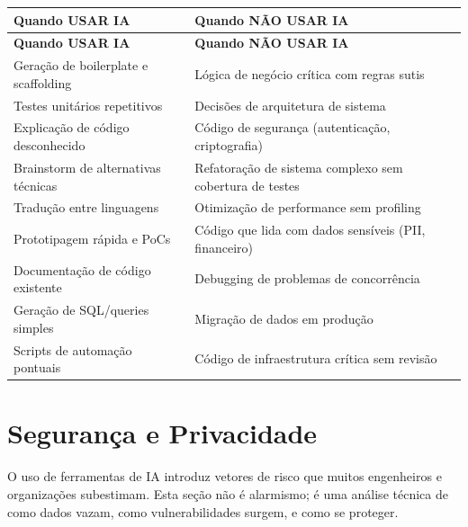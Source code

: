 \begin{longtable}{>{\raggedright\arraybackslash}p{6cm}
                  >{\raggedright\arraybackslash}p{6.5cm}}
\toprule
\textbf{Quando USAR IA} & \textbf{Quando NÃO USAR IA} \\
\midrule
\endfirsthead
\toprule
\textbf{Quando USAR IA} & \textbf{Quando NÃO USAR IA} \\
\midrule
\endhead
\bottomrule
\endfoot

Geração de boilerplate e scaffolding &
Lógica de negócio crítica com regras sutis \\
\midrule

Testes unitários repetitivos &
Decisões de arquitetura de sistema \\
\midrule

Explicação de código desconhecido &
Código de segurança (autenticação, criptografia) \\
\midrule

Brainstorm de alternativas técnicas &
Refatoração de sistema complexo sem cobertura de testes \\
\midrule

Tradução entre linguagens &
Otimização de performance sem profiling \\
\midrule

Prototipagem rápida e PoCs &
Código que lida com dados sensíveis (PII, financeiro) \\
\midrule

Documentação de código existente &
Debugging de problemas de concorrência \\
\midrule

Geração de SQL/queries simples &
Migração de dados em produção \\
\midrule

Scripts de automação pontuais &
Código de infraestrutura crítica sem revisão \\

\end{longtable}

\section{Segurança e Privacidade}

O uso de ferramentas de IA introduz vetores de risco que muitos engenheiros
e organizações subestimam. Esta seção não é alarmismo; é uma análise
técnica de como dados vazam, como vulnerabilidades surgem, e como se
proteger.

